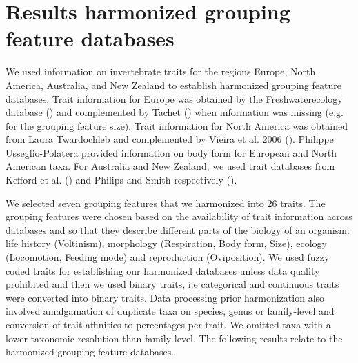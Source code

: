 \documentclass{article}
\begin{document}

\section*{Results harmonized grouping feature databases}

We used information on invertebrate traits for the regions Europe, North America, Australia, and New Zealand to establish harmonized grouping feature databases. Trait information for Europe was obtained by the Freshwaterecology database (\cite{schmidt-kloiber_www.freshwaterecology.info_2015}) and complemented by Tachet (\cite{usseglio-polatera_biomonitoring_2000}) when information was missing (e.g. for the grouping feature size). Trait information for North America was obtained from Laura Twardochleb and complemented by Vieira et al. 2006 (\cite{vieira_database_nodate}). Philippe Usseglio-Polatera provided information on body form for European and North American taxa. 
For Australia and New Zealand, we used trait databases from Kefford et al. (\cite{kefford_integrated_2020}) and Philips and Smith respectively (\cite{Philips_and_Smith_NZ_DB_2018}).

We selected seven grouping features that we harmonized into 26 traits. The grouping features were chosen based on the availability of trait information across databases and so that they describe different parts of the biology of an organism: life history (Voltinism), morphology (Respiration, Body form, Size), ecology (Locomotion, Feeding mode) and reproduction (Oviposition).
We used fuzzy coded traits for establishing our harmonized databases unless data quality prohibited and then we used binary traits, i.e categorical and continuous traits were converted into binary traits. Data processing prior harmonization also involved amalgamation of duplicate taxa on species, genus or family-level and conversion of trait affinities to percentages per trait. We omitted taxa with a lower taxonomic resolution than family-level. The following results relate to the harmonized grouping feature databases.



\newpage 

\end{document}
